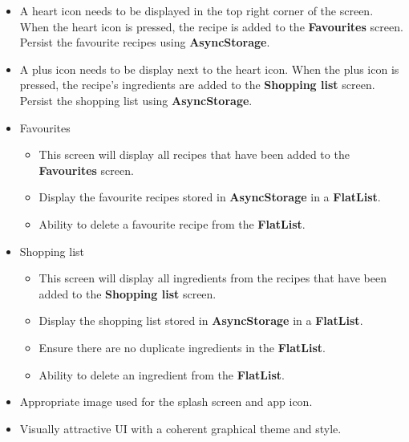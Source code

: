 \documentclass{article}
\begin{document}
\begin{itemize}
\begin{itemize}
\begin{itemize}
    \end{itemize}
    \item A heart icon needs to be displayed in the top right corner of the screen. When the heart icon is pressed, the recipe is added to the \textbf{Favourites} screen. Persist the favourite recipes using \textbf{AsyncStorage}.
    \item A plus icon needs to be display next to the heart icon. When the plus icon is pressed, the recipe's ingredients are added to the \textbf{Shopping list} screen. Persist the shopping list using \textbf{AsyncStorage}.
    \item Favourites
    \begin{itemize}
      \item This screen will display all recipes that have been added to the \textbf{Favourites} screen.
      \item Display the favourite recipes stored in \textbf{AsyncStorage} in a \textbf{FlatList}. 
      \item Ability to delete a favourite recipe from the \textbf{FlatList}.
    \end{itemize}
    \item Shopping list
    \begin{itemize}
      \item This screen will display all ingredients from the recipes that have been added to the \textbf{Shopping list} screen.
      \item Display the shopping list stored in \textbf{AsyncStorage} in a \textbf{FlatList}.
      \item Ensure there are no duplicate ingredients in the \textbf{FlatList}.
      \item Ability to delete an ingredient from the \textbf{FlatList}.
    \end{itemize}
    \item Appropriate image used for the splash screen and app icon.
    \item Visually attractive UI with a coherent graphical theme and style.
  \end{itemize}
\end{itemize}
\end{document}
